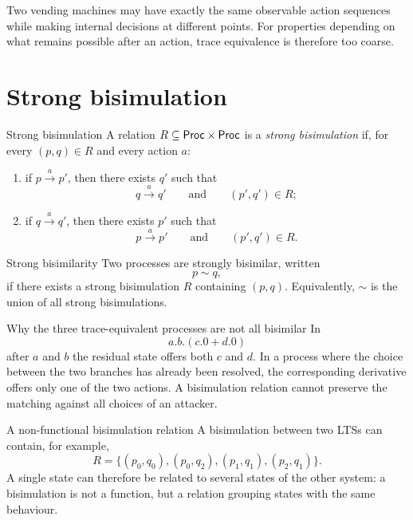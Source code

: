 \documentclass[a4paper]{article}
\newcommand{\Proc}{\mathsf{Proc}}
\newcommand{\trans}[1]{\xrightarrow{#1}}
\begin{document}
Two vending machines may have exactly the same observable action sequences while making internal decisions at different points.
For properties depending on what remains possible after an action, trace equivalence is therefore too coarse.

\section{Strong bisimulation}

\begin{snippetdefinition}{Strong bisimulation}
    A relation \(R\subseteq\Proc\cartesianprod\Proc\) is a \emph{strong bisimulation} if, for every \((p,q)\in R\) and every action \(a\):
    \begin{enumerate}
        \item if \(p\trans{a}p'\), then there exists \(q'\) such that
        \[
            q\trans{a}q'
            \qquad\text{and}\qquad
            (p',q')\in R;
        \]
        \item if \(q\trans{a}q'\), then there exists \(p'\) such that
        \[
            p\trans{a}p'
            \qquad\text{and}\qquad
            (p',q')\in R.
        \]
    \end{enumerate}
\end{snippetdefinition}

\begin{snippetdefinition}{Strong bisimilarity}
    Two processes are strongly bisimilar, written
    \[
        p\sim q,
    \]
    if there exists a strong bisimulation \(R\) containing \((p,q)\).
    Equivalently, \(\sim\) is the union of all strong bisimulations.
\end{snippetdefinition}

\begin{snippetexample}{Why the three trace-equivalent processes are not all bisimilar}
    In
    \[
        a.b.(c.0+d.0)
    \]
    after \(a\) and \(b\) the residual state offers both \(c\) and \(d\).
    In a process where the choice between the two branches has already been resolved, the corresponding derivative offers only one of the two actions.
    A bisimulation relation cannot preserve the matching against all choices of an attacker.
\end{snippetexample}

\begin{snippetexample}{A non-functional bisimulation relation}
    A bisimulation between two LTSs can contain, for example,
    \[
        R=\{(p_0,q_0),(p_0,q_2),(p_1,q_1),(p_2,q_1)\}.
    \]
    A single state can therefore be related to several states of the other system: a bisimulation is not a function, but a relation grouping states with the same behaviour.
\end{snippetexample}
\end{document}
